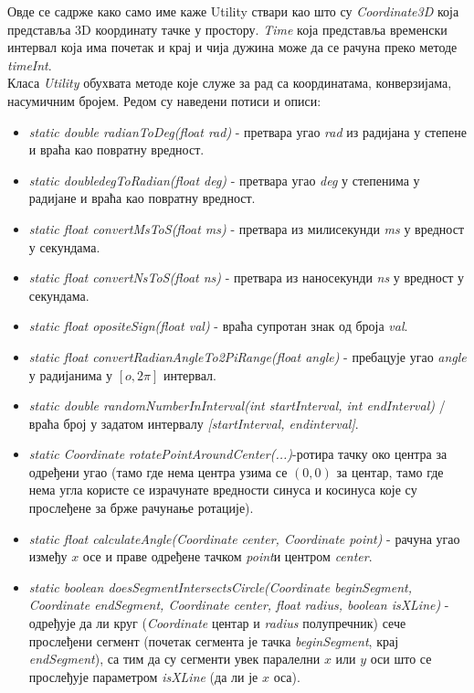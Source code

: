 Овде се садрже како само име каже Utility ствари као што су \emph{Coordinate3D} која представља 3D координату тачке у простору. \emph{Time} која представља временски интервал која има почетак и крај и чија дужина може да се рачуна преко методе \emph{timeInt}.  
\\ \indent 
Класа \emph{Utility} обухвата методе које служе за рад са координатама, конверзијама, насумичним бројем. Редом су наведени потиси и описи:
\begin{itemize}
\item \emph{static double radianToDeg(float rad)} - претвара угао \emph{rad} из радијана у степене и враћа као повратну вредност.
\item \emph{static doubledegToRadian(float deg)} -  претвара угао \emph{deg} у степенима у радијане и враћа као повратну вредност.
\item \emph{static float convertMsToS(float ms)} - претвара из милисекунди \emph{ms} у вредност у секундама. 
\item \emph{static float convertNsToS(float ns)} - претвара из наносекунди \emph{ns} у вредност у секундама.
\item \emph{static float opositeSign(float val)} - враћа супротан знак од броја \emph{val}.
\item \emph{static float convertRadianAngleTo2PiRange(float angle)} - пребацује угао \emph{angle} у радијанима у $\left[ o, 2 \pi \right]$ интервал.
\item \emph{static double randomNumberInInterval(int startInterval, int endInterval)} / враћа број у задатом интервалу \emph{[startInterval, endinterval]}.
\item \emph{static Coordinate rotatePointAroundCenter(...)}-ротира тачку око центра за одређени угао (тамо где нема центра узима се $(0, 0)$ за центар, тамо где нема угла користе се израчунате вредности синуса и косинуса које су прослеђене за брже рачунање ротације).
\item \emph{static float calculateAngle(Coordinate center, Coordinate point)} -  рачуна угао између $x$ осе и праве одређене тачком  \emph{point}и центром \emph{center}.
\item \emph{static boolean doesSegmentIntersectsCircle(Coordinate beginSegment, Coordinate endSegment, Coordinate center, float radius, boolean isXLine)} - одређује да ли круг (\emph{Coordinate} центар и \emph{radius} полупречник) сече прослеђени сегмент (почетак сегмента је тачка \emph{beginSegment}, крај \emph{endSegment}), са тим да су сегменти увек паралелни $x$ или $y$ оси што се прослеђује параметром \emph{isXLine} (да ли је $x$ оса). 

\end{itemize}
